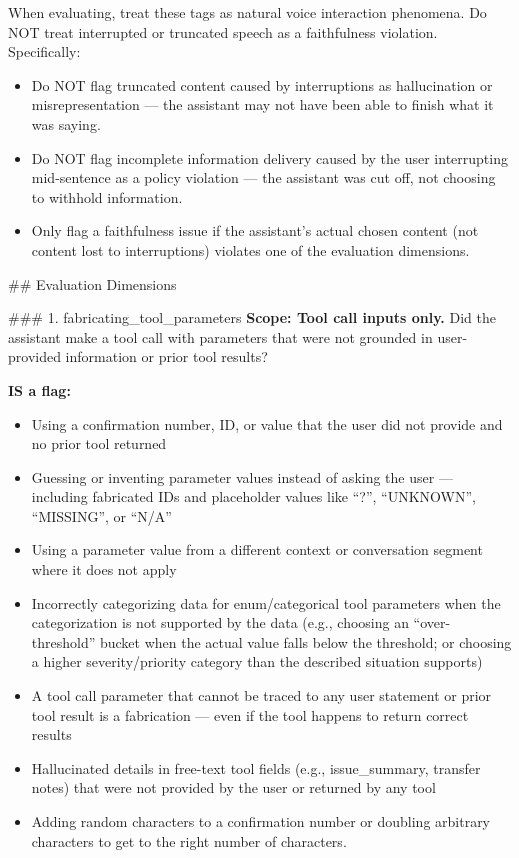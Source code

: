 \begin{tcolorbox}[promptbox, title={\small Faithfulness Prompt}]
      When evaluating, treat these tags as natural voice interaction phenomena. Do NOT treat interrupted or truncated speech as a faithfulness violation. Specifically:
      \begin{itemize}
        \item Do NOT flag truncated content caused by interruptions as hallucination or misrepresentation --- the assistant may not have been able to finish what it was saying.
        \item Do NOT flag incomplete information delivery caused by the user interrupting mid-sentence as a policy violation --- the assistant was cut off, not choosing to withhold information.
        \item Only flag a faithfulness issue if the assistant's actual chosen content (not content lost to interruptions) violates one of the evaluation dimensions.
      \end{itemize}

      \#\# Evaluation Dimensions\newline

      \#\#\# 1. fabricating\_tool\_parameters\newline
      \textbf{Scope: Tool call inputs only.} Did the assistant make a tool call with parameters that were not grounded in user-provided information or prior tool results?\newline

      \textbf{IS a flag:}
      \begin{itemize}
        \item Using a confirmation number, ID, or value that the user did not provide and no prior tool returned
        \item Guessing or inventing parameter values instead of asking the user --- including fabricated IDs and placeholder values like ``?'', ``UNKNOWN'', ``MISSING'', or ``N/A''
        \item Using a parameter value from a different context or conversation segment where it does not apply
        \item Incorrectly categorizing data for enum/categorical tool parameters when the categorization is not supported by the data (e.g., choosing an ``over-threshold'' bucket when the actual value falls below the threshold; or choosing a higher severity/priority category than the described situation supports)
        \item A tool call parameter that cannot be traced to any user statement or prior tool result is a fabrication --- even if the tool happens to return correct results
        \item Hallucinated details in free-text tool fields (e.g., issue\_summary, transfer notes) that were not provided by the user or returned by any tool
        \item Adding random characters to a confirmation number or doubling arbitrary characters to get to the right number of characters.
      \end{itemize}


\end{tcolorbox}
